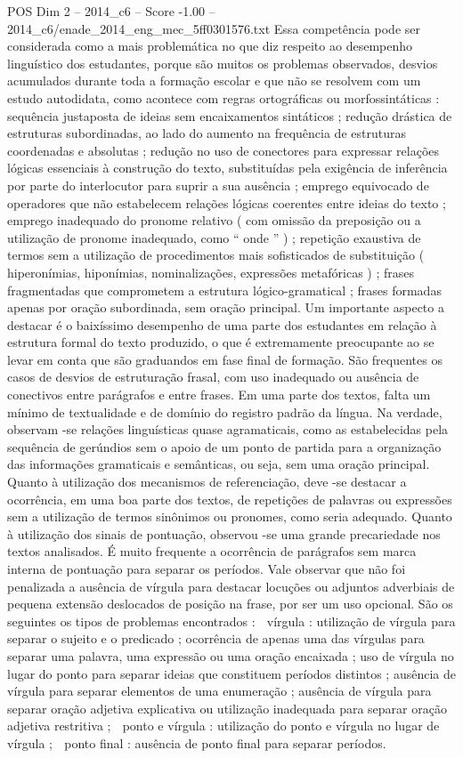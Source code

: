 \begin{textsample}{POS Dim 2 – 2014\_c6 – Score -1.00 – 2014\_c6/enade\_2014\_eng\_mec\_5ff0301576.txt}
Essa competência pode ser considerada como a mais problemática no que diz respeito ao desempenho linguístico dos estudantes, porque são muitos os problemas observados, desvios acumulados durante toda a formação escolar e que não se resolvem com um estudo autodidata, como acontece com regras ortográficas ou morfossintáticas : sequência justaposta de ideias sem encaixamentos sintáticos ; redução drástica de estruturas subordinadas, ao lado do aumento na frequência de estruturas coordenadas e absolutas ; redução no uso de conectores para expressar relações lógicas essenciais à construção do texto, substituídas pela exigência de inferência por parte do interlocutor para suprir a sua ausência ; emprego equivocado de operadores que não estabelecem relações lógicas coerentes entre ideias do texto ; emprego inadequado do pronome relativo ( com omissão da preposição ou a utilização de pronome inadequado, como “ onde ” ) ; repetição exaustiva de termos sem a utilização de procedimentos mais sofisticados de substituição ( hiperonímias, hiponímias, nominalizações, expressões metafóricas ) ; frases fragmentadas que comprometem a estrutura lógico-gramatical ; frases formadas apenas por oração subordinada, sem oração principal.
Um importante aspecto a destacar é o baixíssimo desempenho de uma parte dos estudantes em relação à estrutura formal do texto produzido, o que é extremamente preocupante ao se levar em conta que são graduandos em fase final de formação.
São frequentes os casos de desvios de estruturação frasal, com uso inadequado ou ausência de conectivos entre parágrafos e entre frases.
Em uma parte dos textos, falta um mínimo de textualidade e de domínio do registro padrão da língua.
Na verdade, observam -se relações linguísticas quase agramaticais, como as estabelecidas pela sequência de gerúndios sem o apoio de um ponto de partida para a organização das informações gramaticais e semânticas, ou seja, sem uma oração principal.
Quanto à utilização dos mecanismos de referenciação, deve -se destacar a ocorrência, em uma boa parte dos textos, de repetições de palavras ou expressões sem a utilização de termos sinônimos ou pronomes, como seria adequado.
Quanto à utilização dos sinais de pontuação, observou -se uma grande precariedade nos textos analisados.
É muito frequente a ocorrência de parágrafos sem marca interna de pontuação para separar os períodos.
Vale observar que não foi penalizada a ausência de vírgula para destacar locuções ou adjuntos adverbiais de pequena extensão deslocados de posição na frase, por ser um uso opcional.
São os seguintes os tipos de problemas encontrados :  vírgula : utilização de vírgula para separar o sujeito e o predicado ; ocorrência de apenas uma das vírgulas para separar uma palavra, uma expressão ou uma oração encaixada ; uso de vírgula no lugar do ponto para separar ideias que constituem períodos distintos ; ausência de vírgula para separar elementos de uma enumeração ; ausência de vírgula para separar oração adjetiva explicativa ou utilização inadequada para separar oração adjetiva restritiva ;  ponto e vírgula : utilização do ponto e vírgula no lugar de vírgula ;  ponto final : ausência de ponto final para separar períodos.

\end{textsample}
